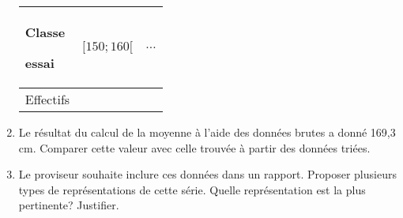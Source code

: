 \documentclass[12pt,french,oneside]{report}
\begin{document}
\begin{spacing}{1.2}
\begin{Exercice}[]
\begin{enumerate}
\begin{tabularx}{\linewidth}{|*{3}{>{\centering\arraybackslash}X|}}
\hline
    Classe\par essai &  $[150;160[$ &  $\ldots$ \\
\hline
  Effectifs &            &            \\
\hline
\end{tabularx} 

\item Le résultat du calcul de la moyenne à l'aide des données brutes a donné 169,3 cm. 
Comparer cette valeur avec celle trouvée à partir des données triées. 

\item Le proviseur souhaite inclure ces données dans un rapport. 
Proposer plusieurs types
de représentations de cette série. 
Quelle représentation est la plus pertinente?
Justifier.
\end{enumerate}
\end{Exercice}


\end{spacing}
\end{document}
